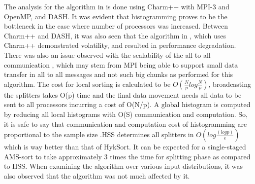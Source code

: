 \documentclass[11pt]{article}       %
\begin{document}
\par The analysis for the algorithm in \cite{paper2} is done using Charm++ with MPI-3 and OpenMP, and DASH. It was evident that histogramming proves to be the bottleneck in the case where number of processors was increased. Between Charm++ and DASH, it was also seen that the algorithm in \cite{paper1}, which uses Charm++ demonstrated volatility, and resulted in performance degradation. There was also an issue observed with the scalability of the all to all communication \cite{paper2}, which may stem from MPI being able to support small data transfer in all to all messages and not such big chunks as performed for this algorithm. The cost for local sorting is calculated to be $ O\left( \frac {N}{p} log \frac{N}{p}\right) $, broadcasting the splitters takes O(p) time and the final data movement needs all data to be sent to all processors incurring a cost of O(N/p). A global histogram is computed by reducing all local histograms with O(S) communication and computation. So, it is safe to say that communication and computation cost of histogramming are proportional to the sample size \cite{paper1}.HSS determines all splitters in $ O\left (log\frac {(log p)}{\epsilon}\right)$ which is way better than that of HykSort. It can be expected for a single-staged AMS-sort to take approximately 3 times the time for splitting phase as compared to HSS\cite{paper1}. When examining the algorithm over various input distributions, it was also observed that the algorithm was not much affected by it\cite{paper1}.




   

\end{document}
